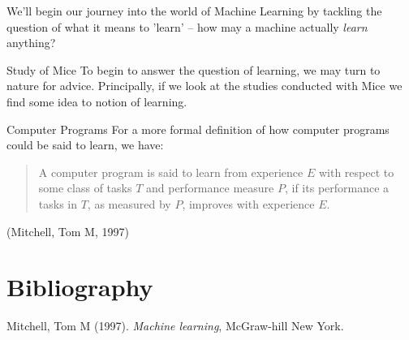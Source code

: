 \documentclass[10pt]{beamer}
\begin{document}
We'll begin our journey into the world of Machine Learning by tackling the question
of what it means to 'learn' -- how may a machine actually \emph{learn} anything?

\begin{frame}[label={sec:orga6b898e}]{Study of Mice}
To begin to answer the question of learning, we may turn to nature for
advice. Principally, if we look at the studies conducted with Mice we find some idea
to notion of learning.
\end{frame}

\begin{frame}[label={sec:org3386874}]{Computer Programs}
For a more formal definition of how computer programs could be said to learn, we have:

\begin{quote}
A computer program is said to learn from experience \(E\) with respect
to some class of tasks \(T\) and performance measure \(P\), if its performance
a tasks in \(T\), as measured by \(P\), improves with experience \(E\).
\end{quote}

(Mitchell, Tom M, 1997)
\end{frame}

\section*{Bibliography}
\label{sec:orga166c57}

\noindent
Mitchell, Tom M (1997). \emph{Machine learning}, McGraw-hill New York.
\end{document}
